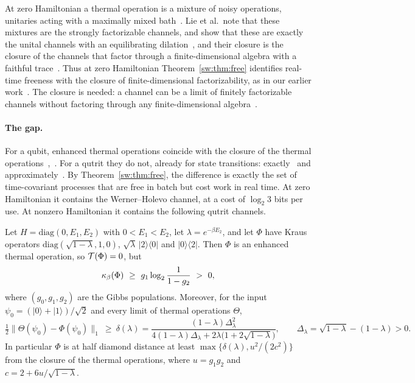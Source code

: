 At zero Hamiltonian a thermal operation is a mixture of noisy operations, unitaries acting with a maximally mixed bath~\cite{HHO03}. Lie et al.\ note that these mixtures are the strongly factorizable channels, and show that these are exactly the unital channels with an equilibrating dilation~\cite[Eq.~(14)]{LieEtAl26}, and their closure is the closure of the channels that factor through a finite-dimensional algebra with a faithful trace~\cite{MullerHermesPerry,Douglas26closed}. Thus at zero Hamiltonian Theorem~\ref{sw:thm:free} identifies real-time freeness with the closure of finite-dimensional factorizability, as in our earlier work~\cite{Memory}. The closure is needed: a channel can be a limit of finitely factorizable channels without factoring through any finite-dimensional algebra~\cite{MusatRordam}.

\paragraph{The gap.} For a qubit, enhanced thermal operations coincide with the closure of the thermal operations~\cite{Cwiklinski15},~\cite[Thm.~10]{vomEnde22}. For a qutrit they do not, already for state transitions: exactly~\cite{Cwiklinski15} and approximately~\cite{DingFengHu21}. By Theorem~\ref{sw:thm:free}, the difference is exactly the set of time-covariant processes that are free in batch but cost work in real time. At zero Hamiltonian it contains the Werner--Holevo channel, at a cost of $\log_2 3$ bits per use. At nonzero Hamiltonian it contains the following qutrit channels.

\begin{proposition}\label{sw:prop:qutrit}
Let $H=\mathrm{diag}(0,E_1,E_2)$ with $0<E_1<E_2$, let $\lambda=e^{-\beta E_2}$, and let $\Phi$ have Kraus operators $\mathrm{diag}(\sqrt{1-\lambda},1,0)$, $\sqrt\lambda\,|2\rangle\langle0|$ and $|0\rangle\langle2|$. Then $\Phi$ is an enhanced thermal operation, so $\mathcal T(\Phi)=0$, but
\[
\Trt(\Phi)\ \ge\ g_1\log_2\frac{1}{1-g_2}\ >\ 0,
\]
where $(g_0,g_1,g_2)$ are the Gibbs populations. Moreover, for the input $\psi_0=(|0\rangle+|1\rangle)/\sqrt2$ and every limit of thermal operations $\Theta$,
\[
\tfrac12\bigl\|\Theta(\psi_0)-\Phi(\psi_0)\bigr\|_1\ \ge\ \delta(\lambda)=\frac{(1-\lambda)\Delta_\lambda^2}{4(1-\lambda)\Delta_\lambda+2\lambda\bigl(1+2\sqrt{1-\lambda}\bigr)},\qquad\Delta_\lambda=\sqrt{1-\lambda}-(1-\lambda)>0.
\]
In particular $\Phi$ is at half diamond distance at least $\max\{\delta(\lambda),u^2/(2c^2)\}$ from the closure of the thermal operations, where $u=g_1g_2$ and $c=2+6u/\sqrt{1-\lambda}$.
\end{proposition}

